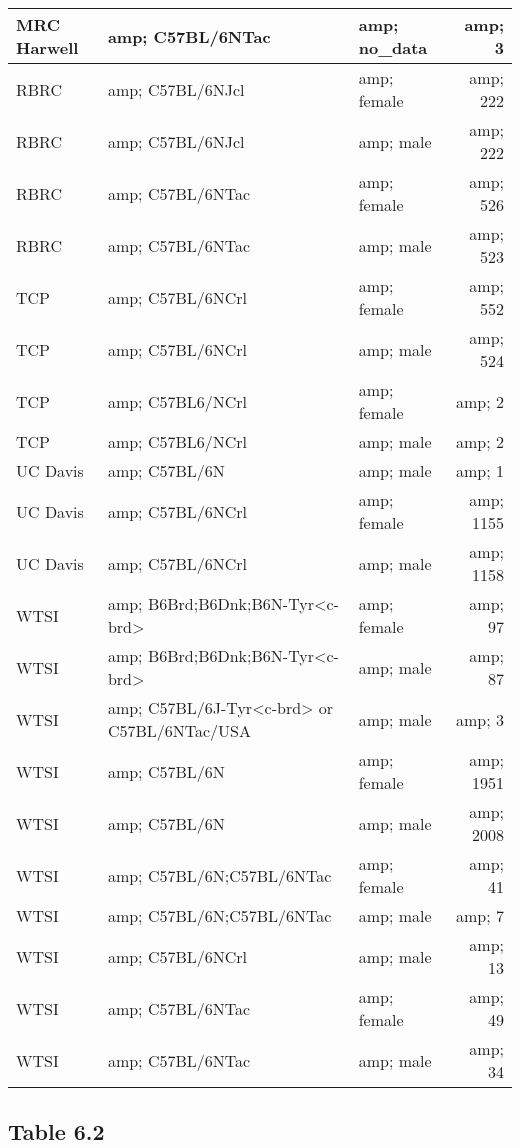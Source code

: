 \documentclass[]{article}
\begin{document}
\begin{table}
\begin{tabular}[t]{l|l|l|r}
\hline
MRC Harwell &amp; C57BL/6NTac &amp; no\_data &amp; 3\\
\hline
RBRC &amp; C57BL/6NJcl &amp; female &amp; 222\\
\hline
RBRC &amp; C57BL/6NJcl &amp; male &amp; 222\\
\hline
RBRC &amp; C57BL/6NTac &amp; female &amp; 526\\
\hline
RBRC &amp; C57BL/6NTac &amp; male &amp; 523\\
\hline
TCP &amp; C57BL/6NCrl &amp; female &amp; 552\\
\hline
TCP &amp; C57BL/6NCrl &amp; male &amp; 524\\
\hline
TCP &amp; C57BL6/NCrl &amp; female &amp; 2\\
\hline
TCP &amp; C57BL6/NCrl &amp; male &amp; 2\\
\hline
UC Davis &amp; C57BL/6N &amp; male &amp; 1\\
\hline
UC Davis &amp; C57BL/6NCrl &amp; female &amp; 1155\\
\hline
UC Davis &amp; C57BL/6NCrl &amp; male &amp; 1158\\
\hline
WTSI &amp; B6Brd;B6Dnk;B6N-Tyr<c-brd> &amp; female &amp; 97\\
\hline
WTSI &amp; B6Brd;B6Dnk;B6N-Tyr<c-brd> &amp; male &amp; 87\\
\hline
WTSI &amp; C57BL/6J-Tyr<c-brd> or C57BL/6NTac/USA &amp; male &amp; 3\\
\hline
WTSI &amp; C57BL/6N &amp; female &amp; 1951\\
\hline
WTSI &amp; C57BL/6N &amp; male &amp; 2008\\
\hline
WTSI &amp; C57BL/6N;C57BL/6NTac &amp; female &amp; 41\\
\hline
WTSI &amp; C57BL/6N;C57BL/6NTac &amp; male &amp; 7\\
\hline
WTSI &amp; C57BL/6NCrl &amp; male &amp; 13\\
\hline
WTSI &amp; C57BL/6NTac &amp; female &amp; 49\\
\hline
WTSI &amp; C57BL/6NTac &amp; male &amp; 34\\
\hline
\end{tabular}
\end{table}

\hypertarget{table-6.2}{%
\subsection{Table 6.2}\label{table-6.2}}
\end{document}
